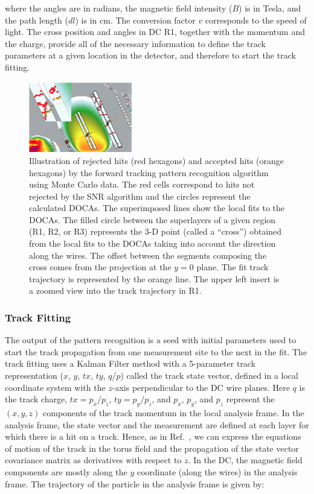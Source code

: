 \noindent
where the angles are in radians, the magnetic field intensity ($B$) is in Tesla, and the path length ($dl$) is in cm.
The conversion factor $v$ corresponds to the speed of light. The cross position and angles in DC R1, together with
the momentum and the charge, provide all of the necessary information to define the track parameters at a given
location in the detector, and therefore to start the track fitting.

\begin{figure}[t]
\centering
\includegraphics[width=0.4\textwidth]{pics/dcPattern13.png}
\caption{Illustration of rejected hits (red hexagons) and accepted hits (orange hexagons) by the forward tracking
  pattern recognition algorithm using Monte Carlo data. The red cells correspond to hits not rejected by the SNR
  algorithm and the circles represent the calculated DOCAs.  The superimposed lines show the local fits to the
  DOCAs. The filled circle between the superlayers of a given region (R1, R2, or R3) represents the 3-D point
  (called a ``cross'') obtained from the local fits to the DOCAs taking into account the direction along the wires. The
  offset between the segments composing the cross comes from the projection at the $y=0$ plane. The fit track
  trajectory is represented by the orange line. The upper left insert is a zoomed view into the track trajectory in R1.}
\label{fig:dcsegs}
\end{figure}

\subsubsection{Track Fitting}
\label{sec-trackfitting}

The output of the pattern recognition is a seed with initial parameters used to start the track propagation from one
measurement site to the next in the fit. The track fitting uses a Kalman Filter method with a 5-parameter track
representation ($x$, $y$, $tx$, $ty$, $q$/$p$) called the track state vector, defined in a local coordinate system
with the $z$-axis perpendicular to the DC wire planes. Here $q$ is the track charge, $tx=p_x/p_z$, $ty=p_y/p_z$,
and $p_x$, $p_y$, and $p_z$ represent the $(x,y,z)$ components of the track momentum in the local analysis frame.
In the analysis frame, the state vector and the measurement are defined at each layer for which there is a hit on a
track. Hence, as in Ref.~\cite{spiri}, we can express the equations of motion of the track in the torus field and the
propagation of the state vector covariance matrix as derivatives with respect to $z$. In the DC, the magnetic field
components are mostly along the $y$ coordinate (along the wires) in the analysis frame. The trajectory of the particle
in the analysis frame is given by:

